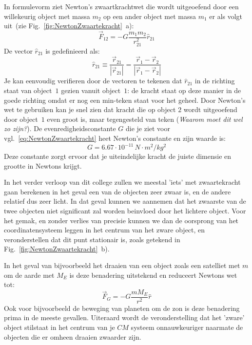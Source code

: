 In formulevorm ziet Newton's zwaartkrachtwet die wordt uitgeoefend door een willekeurig object met
massa $m_2$ op een ander object met massa $m_1$ er als volgt uit~(zie Fig.~\ref{fig:NewtonZwaartekracht}~a):
\begin{equation}\label{eq:NewtonZwaartekracht}
\vec{F}_{12} = - G\frac{m_1 m_2}{r_{21}^2}\hat{r}_{21}
\end{equation}
De vector $\hat{r}_{21}$ is gedefinieerd als:
\begin{equation}
\hat{r}_{21} \equiv \frac{\vec{r}_{21}}{|\vec{r}_{21}|}= \frac{\vec{r}_1 - \vec{r}_2}{|\vec{r}_1-\vec{r}_2|} 
\end{equation}
Je kan eenvoudig verifieren door de vectoren te tekenen dat $\hat{r}_{21}$ in de richting staat
van object~$1$ gezien vanuit object~$1$: de kracht staat op deze manier in de goede richting omdat
er nog een min-teken staat voor het geheel. Door Newton's wet te gebruiken kan je snel zien dat
 kracht die op object $2$ wordt uitgeoefend door object~$1$ even groot is, maar tegengesteld van 
 teken (\emph{Waarom moet dit wel zo zijn?}). De evenredigheidsconstante $G$ die je ziet voor  
 vgl.~\ref{eq:NewtonZwaartekracht} heet Newton's constante en zijn waarde is:
 \begin{equation}
 G = 6.67\cdot10^{-11}\,N\cdot m^2/kg^2
 \end{equation}
Deze constante zorgt ervoor dat je uiteindelijke kracht de juiste dimensie en grootte in Newtons krijgt. 

In het verder verloop van dit college zullen we meestal 'iets' met zwaartekracht gaan berekenen in het
geval een van de objecten zeer zwaar is, en de andere relatief dus zeer licht. In dat geval kunnen we aannemen
dat het zwaarste van de twee objecten niet significant zal worden beinvloed door het lichtere object. Voor
het gemak, en zonder verlies van precisie kunnen we dan de oorsprong van het coordinatensysteem leggen in het 
centrum van het zware object, en veronderstellen dat dit punt stationair is, zoals getekend in Fig.~\ref{fig:NewtonZwaartekracht}~b).

In het geval van bijvoorbeeld het draaien van een object zoals een satelliet met $m$ om de aarde met $M_E$
is deze benadering uitstekend en reduceert Newtons wet tot:
\begin{equation}\label{eq:NewtonZwaartekracht2}
\vec{F}_{G} = - G\frac{m M_E}{r^2}\hat{r}
\end{equation}
Ook voor bijvoorbeeld de beweging van planeten om de zon is deze benadering prima in de meeste gevallen.
Uiteraard wordt de veronderstelling dat het 'zware' object stilstaat in het centrum van je $CM$ systeem onnauwkeuriger
naarmate de objecten die er omheen draaien zwaarder zijn.

